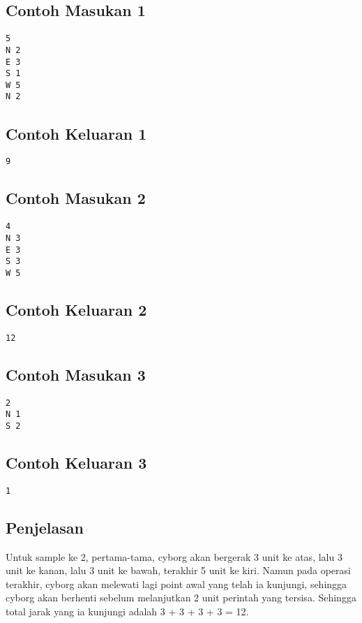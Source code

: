 \documentclass{article}
\begin{document}
\begin{multicols}{2}
\subsection*{Contoh Masukan 1}
\begin{lstlisting}
5
N 2
E 3
S 1
W 5
N 2
\end{lstlisting}
\null
\columnbreak
\subsection*{Contoh Keluaran 1}
\begin{lstlisting}
9
\end{lstlisting}
\vfill
\null
\end{multicols}

\begin{multicols}{2}
\subsection*{Contoh Masukan 2}
\begin{lstlisting}
4
N 3
E 3
S 3
W 5
\end{lstlisting}
\null
\columnbreak
\subsection*{Contoh Keluaran 2}
\begin{lstlisting}
12
\end{lstlisting}
\vfill
\null
\end{multicols}

\begin{multicols}{2}
\subsection*{Contoh Masukan 3}
\begin{lstlisting}
2
N 1
S 2
\end{lstlisting}
\null
\columnbreak
\subsection*{Contoh Keluaran 3}
\begin{lstlisting}
1
\end{lstlisting}
\vfill
\null
\end{multicols}

\subsection*{Penjelasan}
Untuk sample ke 2, pertama-tama, cyborg akan bergerak 3 unit ke atas, lalu 3 unit ke kanan, lalu 3 unit ke bawah, terakhir 5 unit ke kiri. Namun pada operasi terakhir,  cyborg akan melewati lagi point awal yang telah ia kunjungi, sehingga cyborg akan berhenti sebelum melanjutkan 2 unit perintah yang tersisa. Sehingga total jarak yang ia kunjungi adalah 3 + 3 + 3 + 3 = 12. 
\end{document}

